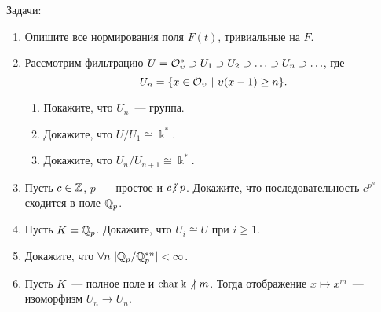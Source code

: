 	\begin{homework}\label{ag_2_hw_1}
		Задачи:
		\begin{enumerate}
			\item Опишите все нормирования поля $F(t)$, тривиальные на $F$.

			\item Рассмотрим фильтрацию $U = \mathcal{O}_{\upsilon}^* \supset U_1 \supset U_2 \supset \ldots \supset U_n \supset \ldots$, где 
			\[
				U_n = \{ x \in \mathcal{O}_{\upsilon} \ \vert \ \upsilon(x - 1) \ge n \}. 
			\]
			\begin{enumerate}
				\item Покажите, что $U_n$~--- группа. 

				\item Докажите, что $U/U_1 \cong \Bbbk^*$. 

				\item Докажите, что $U_n/U_{n + 1} \cong \Bbbk^*$.
			\end{enumerate}

			\item Пусть $c \in \mathbb{Z}$, $p$~--- простое и $c \notdivby p$. Докажите, что последовательность $c^{p^n}$ сходится в поле $\mathbb{Q}_{p}$.

			\item Пусть $K = \mathbb{Q}_{p}$. Докажите, что $U_i \cong U$ при $i \ge 1$. 

			\item Докажите, что $\forall n \ |\Q_{p}/\Q_{p}^{*n}| < \infty$.

			\item Пусть $K$~--- полное поле и $\operatorname{char}{\Bbbk} \not\ \mid m$. Тогда отображение $x \mapsto x^m$~--- изоморфизм $U_n \to U_n$.
		\end{enumerate}
	\end{homework}




	

	

	

	

	